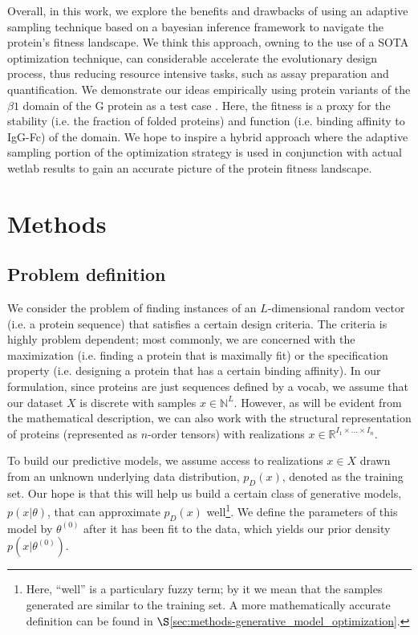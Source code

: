 \documentclass{article}
\begin{document}
Overall, in this work, we explore the benefits and drawbacks of using an
adaptive sampling technique based on a bayesian inference framework to navigate
the protein's fitness landscape. We think this approach, owning to the use of a
SOTA optimization technique, can considerable accelerate the evolutionary design
process, thus reducing resource intensive tasks, such as assay preparation and
quantification. We demonstrate our ideas empirically using protein variants of
the $\beta 1$ domain of the G protein as a test case \cite{wu2016adaptation}.
Here, the fitness is a proxy for the stability (i.e. the fraction of folded
proteins) and function (i.e. binding affinity to IgG-Fc) of the domain. We hope
to inspire a hybrid approach where the adaptive sampling portion of the
optimization strategy is used in conjunction with actual wetlab results to gain
an accurate picture of the protein fitness landscape.


\section{Methods}
\label{sec:methods}

\subsection{Problem definition}
\label{sec:methods-problem_definition}
We consider the problem of finding instances of an $L$-dimensional random vector
(i.e. a protein sequence) that satisfies a certain design criteria. The criteria
is highly problem dependent; most commonly, we are concerned with the
maximization (i.e. finding a protein that is maximally fit) or the specification
property (i.e. designing a protein that has a certain binding affinity). In our
formulation, since proteins are just sequences defined by a vocab, we assume
that our dataset $X$ is discrete with samples $x \in \mathbb{N}^L$. However, as
will be evident from the mathematical description, we can also work with the
structural representation of proteins (represented as $n$-order tensors) with
realizations $x \in \mathbb{R}^{I_1 \times \dots \times I_n}$.

To build our predictive models, we assume access to realizations $x \in X$ drawn
from an unknown underlying data distribution, $p_D(x)$, denoted as the training
set. Our hope is that this will help us build a certain class of generative
models, $p(x|\theta)$, that can approximate $p_D(x)$ well\footnote{Here,
``well'' is a particulary fuzzy term; by it we mean that the samples generated
are similar to the training set. A more mathematically accurate definition can
be found in $\S$\ref{sec:methods-generative_model_optimization}.}. We define the
parameters of this model by $\theta^{(0)}$ after it has been fit to the data,
which yields our prior density $p(x|\theta^{(0)})$.
\end{document}
